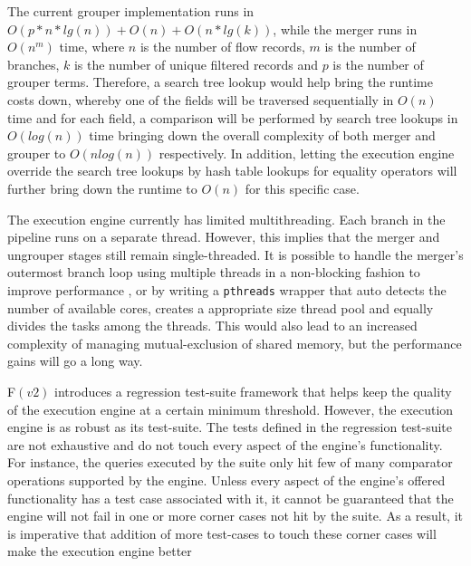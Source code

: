  The current grouper implementation runs in $O(p * n*lg(n)) + O(n) +
 O(n*lg(k))$, while the merger runs in $O(n^m)$ time, where $n$ is the number
 of flow records, $m$ is the number of branches, $k$ is the number of unique
  filtered records and $p$ is
 the number of grouper terms.  Therefore, a search tree lookup would help
 bring the runtime costs down, whereby one of the fields will be traversed
 sequentially in $O(n)$ time and for each field, a comparison will be
 performed by search tree lookups in $O(log(n))$ time bringing down the
 overall complexity of both merger and grouper to $O(nlog(n))$ respectively.
 In addition, letting the execution engine override the search tree lookups by
 hash table lookups for equality operators will further bring down the runtime
 to $O(n)$ for this specific case.











The execution engine currently has limited multithreading. Each branch in the
pipeline runs on a separate thread. However, this implies that the merger and
ungrouper stages still remain single-threaded. It is possible to handle the
merger's outermost branch loop using multiple threads in a non-blocking
fashion to improve performance , or by
writing a \texttt{pthreads} wrapper that auto detects the number of available
cores, creates a appropriate size thread pool and equally divides the tasks
among the threads. This would also lead to an increased complexity of managing
mutual-exclusion of shared memory, but the performance gains will go a long
way.






F$(v2)$ introduces a regression test-suite framework that helps keep the
quality of the execution engine at a certain minimum threshold. However, the
execution engine is as robust as its test-suite. The tests defined in the
regression test-suite are not exhaustive and do not touch every aspect of the
engine's  functionality. For
instance, the queries executed by the suite only hit few of many comparator
operations supported by the engine. Unless every aspect of the engine's offered
functionality has a test case associated with it, it cannot be guaranteed that
the engine will not fail in one or more corner cases not hit by the suite. As a
result, it is imperative that addition of more test-cases to touch these corner
cases will make the execution engine better





